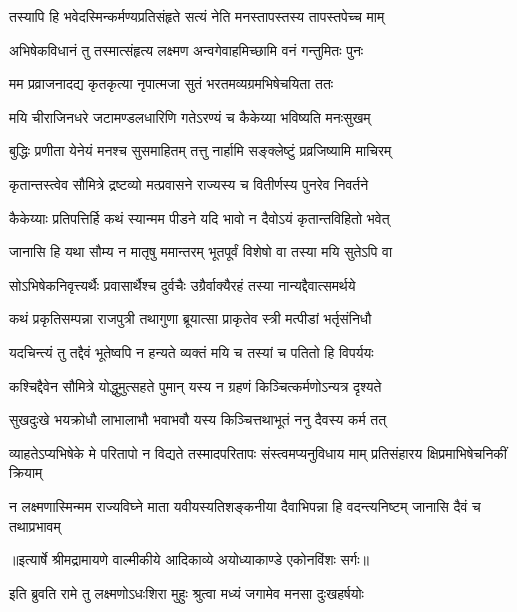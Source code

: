 \twolineshloka
{तस्यापि हि भवेदस्मिन्कर्मण्यप्रतिसंहृते}
{सत्यं नेति मनस्तापस्तस्य तापस्तपेच्च माम्} %

\twolineshloka
{अभिषेकविधानं तु तस्मात्संहृत्य लक्ष्मण}
{अन्वगेवाहमिच्छामि वनं गन्तुमितः पुनः} %

\twolineshloka
{मम प्रव्राजनादद्य कृतकृत्या नृपात्मजा}
{सुतं भरतमव्यग्रमभिषेचयिता ततः} %

\twolineshloka
{मयि चीराजिनधरे जटामण्डलधारिणि}
{गतेऽरण्यं च कैकेय्या भविष्यति मनःसुखम्} %

\twolineshloka
{बुद्धिः प्रणीता येनेयं मनश्च सुसमाहितम्}
{तत्तु नार्हामि सङ्क्लेष्टुं प्रव्रजिष्यामि माचिरम्} %

\twolineshloka
{कृतान्तस्त्वेव सौमित्रे द्रष्टव्यो मत्प्रवासने}
{राज्यस्य च वितीर्णस्य पुनरेव निवर्तने} %

\twolineshloka
{कैकेय्याः प्रतिपत्तिर्हि कथं स्यान्मम पीडने}
{यदि भावो न दैवोऽयं कृतान्तविहितो भवेत्} %

\twolineshloka
{जानासि हि यथा सौम्य न मातृषु ममान्तरम्}
{भूतपूर्वं विशेषो वा तस्या मयि सुतेऽपि वा} %

\twolineshloka
{सोऽभिषेकनिवृत्त्यर्थैः प्रवासार्थैश्च दुर्वचैः}
{उग्रैर्वाक्यैरहं तस्या नान्यद्दैवात्समर्थये} %

\twolineshloka
{कथं प्रकृतिसम्पन्ना राजपुत्री तथागुणा}
{ब्रूयात्सा प्राकृतेव स्त्री मत्पीडां भर्तृसंनिधौ} %

\twolineshloka
{यदचिन्त्यं तु तद्दैवं भूतेष्वपि न हन्यते}
{व्यक्तं मयि च तस्यां च पतितो हि विपर्ययः} %

\twolineshloka
{कश्चिद्दैवेन सौमित्रे योद्धुमुत्सहते पुमान्}
{यस्य न ग्रहणं किञ्चित्कर्मणोऽन्यत्र दृश्यते} %

\twolineshloka
{सुखदुःखे भयक्रोधौ लाभालाभौ भवाभवौ}
{यस्य किञ्चित्तथाभूतं ननु दैवस्य कर्म तत्} %

\threelineshloka
{व्याहतेऽप्यभिषेके मे परितापो न विद्यते}
{तस्मादपरितापः संस्त्वमप्यनुविधाय माम्}
{प्रतिसंहारय क्षिप्रमाभिषेचनिकीं क्रियाम्} %

\fourlineindentedshloka
{न लक्ष्मणास्मिन्मम राज्यविघ्ने}
{माता यवीयस्यतिशङ्कनीया}
{दैवाभिपन्ना हि वदन्त्यनिष्टम्}
{जानासि दैवं च तथाप्रभावम्} %


{॥इत्यार्षे श्रीमद्रामायणे वाल्मीकीये आदिकाव्ये अयोध्याकाण्डे एकोनविंशः सर्गः॥}


\twolineshloka
{इति ब्रुवति रामे तु लक्ष्मणोऽधःशिरा मुहुः}
{श्रुत्वा मध्यं जगामेव मनसा दुःखहर्षयोः} %

